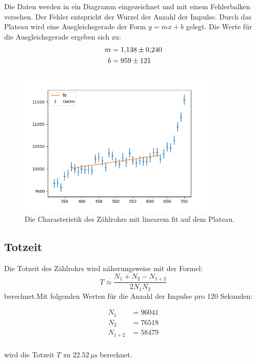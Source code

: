 \noindent Die Daten werden in ein Diagramm eingezeichnet und mit einem Fehlerbalken versehen. Der Fehler entspricht der Wurzel der Anzahl der Impulse.
Durch das Plateau wird eine Ausgleichsgerade der Form $y = mx + b$ gelegt. Die Werte für die Ausgleichsgerade ergeben sich zu:
\begin{align}
    m&= \num{1.138 \pm 0.24} \nonumber \\
    b&= \num{959 \pm 121}    \nonumber
\end{align}

\begin{figure}[H]
    \centering
    \includegraphics[width=0.85\textwidth]{build/plots/a.png}
    \caption{Die Charasteristik des Zählrohrs mit linearem fit auf dem Plateau.}
    \label{img:plot1}
\end{figure}

\subsection{Totzeit}

\noindent Die Totzeit des Zählrohrs wird näherungsweise mit der Formel:
\begin{equation}
    T \approx \frac{N_1 + N_2 - N_{1+2}}{2N_1N_2}
\end{equation}
\noindent berechnet.Mit folgenden Werten für die Anzahl der Impulse pro 120 Sekunden:

\begin{align} 
    N_1 &= 96041\\
    N_2 &= 76518\\
    N_{1+2} &= 58479\\
\end{align}

\noindent wird die Totzeit $T$ zu $\SI{22.52}{\micro\second}$ berechnet.

